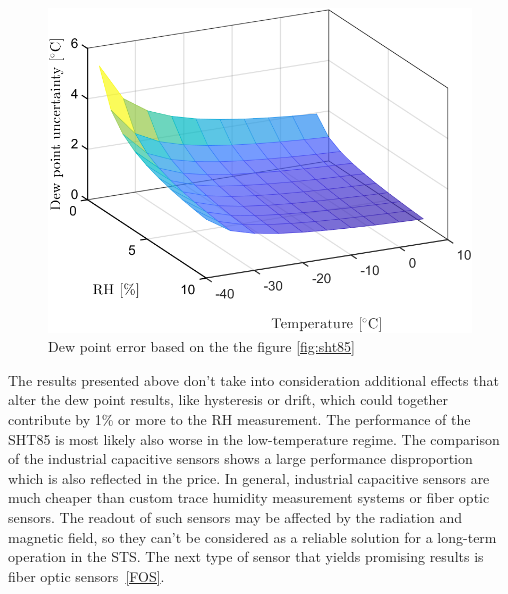 \begin{figure}[!h]
\centering
\includegraphics[width=0.6\columnwidth]{Chapter5/images/SHTRH15T02.png}
\caption{Dew point error based on the the figure \ref{fig:sht85}}
\label{fig:sht85_dp}
\end{figure}
\newpage
The results presented above don't take into consideration additional effects that alter the dew point results, like hysteresis or drift, which could together contribute by 1\% or more to the \gls{RH} measurement. The performance of the SHT85 is most likely also worse in the low-temperature regime. The comparison of the industrial capacitive sensors shows a large performance disproportion which is also reflected in the price. In general, industrial capacitive sensors are much cheaper than custom trace humidity measurement systems or fiber optic sensors. The readout of such sensors may be affected by the radiation and magnetic field, so they can't be considered as a reliable solution for a long-term operation in the \gls{STS}. The next type of sensor that yields promising results is fiber optic sensors~\ref{FOS}.

